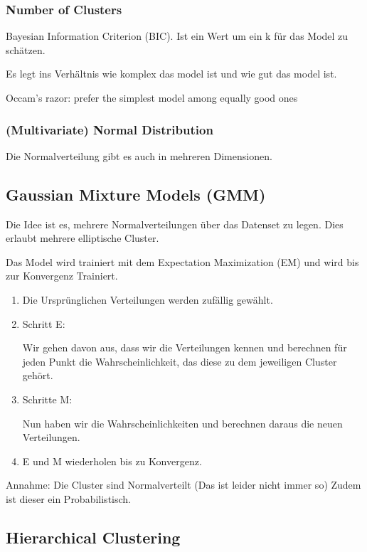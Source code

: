 \documentclass[a4paper]{article}
\begin{document}
\subsubsection*{Number of Clusters}

Bayesian Information Criterion (BIC). Ist ein Wert um ein k für das Model zu schätzen.

Es legt ins Verhältnis wie komplex das model ist und wie gut das model ist.

Occam's razor: prefer the simplest model among equally good ones

\subsubsection*{(Multivariate) Normal Distribution}

Die Normalverteilung gibt es auch in mehreren Dimensionen.

\subsection{Gaussian Mixture Models (GMM)}

Die Idee ist es, mehrere Normalverteilungen über das Datenset zu legen. Dies erlaubt mehrere elliptische Cluster.

Das Model wird trainiert mit dem Expectation Maximization (EM) und wird bis zur Konvergenz Trainiert.

\begin{enumerate}
    \item Die Ursprünglichen Verteilungen werden zufällig gewählt.
    \item Schritt E:
    
    Wir gehen davon aus, dass wir die Verteilungen kennen und berechnen für jeden Punkt die Wahrscheinlichkeit, das diese zu dem jeweiligen Cluster gehört.
    \item Schritte M:
    
    Nun haben wir die Wahrscheinlichkeiten und berechnen daraus die neuen Verteilungen.
    \item E und M wiederholen bis zu Konvergenz.
\end{enumerate}


Annahme: Die Cluster sind Normalverteilt (Das ist leider nicht immer so) Zudem ist dieser ein Probabilistisch.

\subsection{Hierarchical Clustering}
\end{document}
